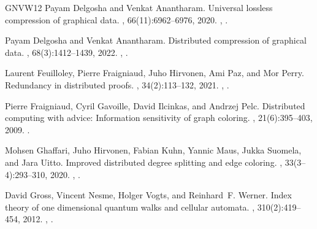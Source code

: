 \documentclass[11pt]{article}
\theoremstyle{definition}
\theoremstyle{remark}
\begin{document}
\begin{thebibliography}{GNVW12}
Payam Delgosha and Venkat Anantharam.
\newblock Universal lossless compression of graphical data.
, 66(11):6962--6976,
  2020.
\newblock \href {https://arxiv.org/abs/1909.09844} {},
  \href {https://doi.org/10.1109/TIT.2020.2991384}
  {}.

Payam Delgosha and Venkat Anantharam.
\newblock Distributed compression of graphical data.
, 68(3):1412--1439,
  2022.
\newblock \href {https://arxiv.org/abs/1802.07446} {},
  \href {https://doi.org/10.1109/TIT.2021.3129189}
  {}.

Laurent Feuilloley, Pierre Fraigniaud, Juho Hirvonen, Ami Paz, and Mor Perry.
\newblock Redundancy in distributed proofs.
, 34(2):113--132, 2021.
\newblock \href {https://arxiv.org/abs/1803.03031} {},
  \href {https://doi.org/10.1007/s00446-020-00386-z}
  {}.

Pierre Fraigniaud, Cyril Gavoille, David Ilcinkas, and Andrzej Pelc.
\newblock Distributed computing with advice: Information sensitivity of graph
  coloring.
, 21(6):395--403, 2009.
\newblock \href {https://doi.org/10.1007/s00446-008-0076-y}
  {}.

Mohsen Ghaffari, Juho Hirvonen, Fabian Kuhn, Yannic Maus, Jukka Suomela, and
  Jara Uitto.
\newblock Improved distributed degree splitting and edge coloring.
, 33(3--4):293--310, 2020.
\newblock \href {https://arxiv.org/abs/1706.04746} {},
  \href {https://doi.org/10.1007/s00446-018-00346-8}
  {}.

David Gross, Vincent Nesme, Holger Vogts, and Reinhard~F. Werner.
\newblock Index theory of one dimensional quantum walks and cellular automata.
, 310(2):419--454, 2012.
\newblock \href {https://arxiv.org/abs/0910.3675} {},
  \href {https://doi.org/10.1007/s00220-012-1423-1}
  {}.


\end{thebibliography}
\end{document}
